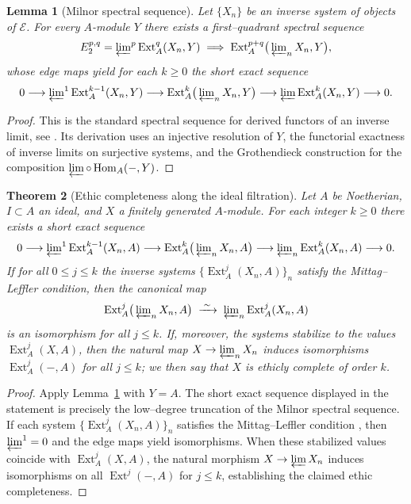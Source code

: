 \documentclass[12pt]{article}
\newcommand{\E}{\mathcal{E}}
\newcommand{\Hom}{\operatorname{Hom}}
\newcommand{\Ext}{\operatorname{Ext}}
\theoremstyle{plain}
\newtheorem{theorem}{Theorem}[section]
\newtheorem{lemma}[theorem]{Lemma}
\theoremstyle{definition}
\theoremstyle{remark}
\numberwithin{equation}{section}
\begin{document}
\begin{lemma}[Milnor spectral sequence]\label{lem:milnor}
Let \(\{X_n\}\) be an inverse system of objects of \(\E\).
For every \(A\)-module \(Y\) there exists a first–quadrant spectral sequence
\[
E_2^{p,q}=\varprojlim\nolimits^{p}\Ext^q_A(X_n,Y)
\;\Longrightarrow\;
\Ext_A^{p+q}\!\big(\varprojlim\nolimits_{n} X_n,Y\big),
\]
whose edge maps yield for each \(k\ge0\) the short exact sequence
\[
0\longrightarrow \varprojlim\nolimits^{1}\Ext_A^{k-1}(X_n,Y)
\longrightarrow \Ext_A^{k}\!\big(\varprojlim\nolimits_{n} X_n,Y\big)
\longrightarrow \varprojlim\nolimits\Ext_A^{k}(X_n,Y)\longrightarrow 0.
\]
\end{lemma}

\begin{proof}
This is the standard spectral sequence for derived functors of an inverse limit, see \cite{Weibel1994}. Its derivation uses an injective resolution of \(Y\),
the functorial exactness of inverse limits on surjective systems, and the Grothendieck
construction for the composition \(\varprojlim\circ\Hom_A(-,Y)\).
\end{proof}

\begin{theorem}[Ethic completeness along the ideal filtration]\label{th:completeness}
Let \(A\) be Noetherian, \(I\subset A\) an ideal, and \(X\) a finitely generated \(A\)-module.
For each integer \(k\ge0\) there exists a short exact sequence
\[
0\longrightarrow
\varprojlim\nolimits^{1}\Ext_A^{k-1}(X_n,A)
\longrightarrow
\Ext_A^{k}\!\big(\varprojlim\nolimits_{n} X_n,A\big)
\longrightarrow
\varprojlim\nolimits_{n}\Ext_A^{k}(X_n,A)
\longrightarrow 0.
\]
If for all \(0\le j\le k\) the inverse systems
\(\{\Ext_A^{j}(X_n,A)\}_n\) satisfy the Mittag–Leffler condition, then the canonical map
\[
\Ext_A^{j}\!\big(\varprojlim\nolimits_{n} X_n,A\big)
\;\xrightarrow{\;\sim\;}\;
\varprojlim\nolimits_{n}\Ext_A^{j}(X_n,A)
\]
is an isomorphism for all \(j\le k\).
If, moreover, the systems stabilize to the values \(\Ext_A^{j}(X,A)\), then the natural map
\(X\to\varprojlim_n X_n\) induces isomorphisms
\(\Ext_A^{j}(-,A)\) for all \(j\le k\); we then say that \(X\) is ethicly complete of order \(k\).
\end{theorem}

\begin{proof}
Apply Lemma~\ref{lem:milnor} with \(Y=A\). The short exact sequence displayed in the statement
is precisely the low–degree truncation of the Milnor spectral sequence.
If each system \(\{\Ext^j_A(X_n,A)\}_n\) satisfies the Mittag–Leffler condition
\cite{Weibel1994}, then \(\varprojlim^1=0\) and the edge maps yield isomorphisms.
When these stabilized values coincide with \(\Ext_A^{j}(X,A)\),
the natural morphism \(X\to\varprojlim X_n\) induces isomorphisms on all
\(\Ext^j(-,A)\) for \(j\le k\), establishing the claimed ethic completeness.
\end{proof}
\end{document}
